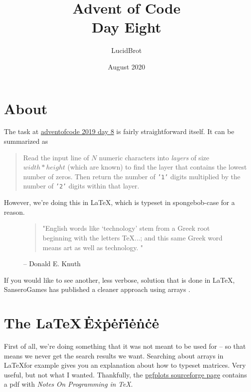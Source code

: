 \documentclass{article} \usepackage[utf8]{inputenc}
\title{Advent of Code\\
{\large Day Eight}}
\author{LucidBrot} \date{August 2020}
\begin{document}
\maketitle

\section{About}
The task at \href{https://adventofcode.com/2019/day/8}{adventofcode 2019 day 8} is fairly straightforward itself. It can be summarized as \begin{myquote}\begin{quote}
Read the input line of $N$ numeric characters into \textit{layers} of size $width * height$ (which are known) to find the layer that contains the lowest number of zeros. Then return the number of \texttt{'1'} digits multiplied by the number of \texttt{'2'} digits within that layer.
\end{quote}\end{myquote}

However, we're doing this in \LaTeX , which is typeset in spongebob-case for a reason.

\begin{figure}[ht]
\begin{myquote}
\begin{quote}
"English words like ‘technology’ stem from a Greek root beginning with the letters
\TeX ...; and this same Greek word means art as well as technology. "
\end{quote}
\end{myquote}
\caption{-- Donald E. Knuth }
\end{figure}

If you would like to see another, less verbose, solution that is done in \LaTeX, SanseroGames has published a cleaner approach using arrays .

\newpage
\tableofcontents
\newpage

\section{The \LaTeX\,\.E\.x\.p\.e\.r\.i\.e\.n\.c\.e}
First of all, we're doing something that it was not meant to be used for -- so that means we never get the search results we want. Searching about arrays in \LaTeX for example gives you an explanation about how to typeset matrices. Very useful, but not what I wanted. Thankfully, the \href{http://pgfplots.sourceforge.net/TeX-programming-notes.pdf}{pgfplots sourceforge page} contains a pdf with \textit{Notes On Programming in \TeX}.
\end{document}
